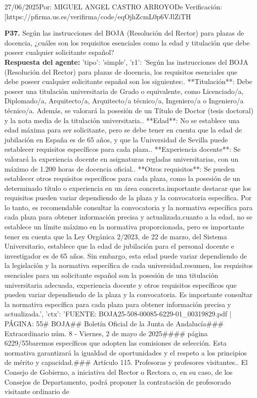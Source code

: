 \documentclass{article}
\begin{document}
\begin{itemize}
{27/06/2025\nFirmado Por: MIGUEL ANGEL CASTRO ARROYO\nUrl De Verificación: [https://pfirma.us.es/verifirma/code/eqOjhZcmL0p6VJlZiTH%

      \item \textbf{P37.} Según las instrucciones del BOJA (Resolución del Rector) para plazas de docencia, ¿cuáles son los requisitos esenciales como la edad y titulación que debe poseer cualquier solicitante español? \\
            \textbf{Respuesta del agente:} {'tipo': 'simple', 'r1': 'Según las instrucciones del BOJA (Resolución del Rector) para plazas de docencia, los requisitos esenciales que debe poseer cualquier solicitante español son los siguientes:\n{}. **Titulación**: Debe poseer una titulación universitaria de Grado o equivalente, como Licenciado/a, Diplomado/a, Arquitecto/a, Arquitecto/a técnico/a, Ingeniero/a o Ingeniero/a técnico/a. Además, se valorará la posesión de un Título de Doctor (tesis doctoral) y la nota media de la titulación universitaria.. **Edad**: No se establece una edad máxima para ser solicitante, pero se debe tener en cuenta que la edad de jubilación en España es de 65 años, y que la Universidad de Sevilla puede establecer requisitos específicos para cada plaza.. **Experiencia docente**: Se valorará la experiencia docente en asignaturas regladas universitarias, con un máximo de 1.200 horas de docencia oficial.. **Otros requisitos**: Se pueden establecer otros requisitos específicos para cada plaza, como la posesión de un determinado título o experiencia en un área concreta.\n\nEs importante destacar que los requisitos pueden variar dependiendo de la plaza y la convocatoria específica. Por lo tanto, es recomendable consultar la convocatoria y la normativa específica para cada plaza para obtener información precisa y actualizada.\n\nEn cuanto a la edad, no se establece un límite máximo en la normativa proporcionada, pero es importante tener en cuenta que la Ley Orgánica 2/2023, de 22 de marzo, del Sistema Universitario, establece que la edad de jubilación para el personal docente e investigador es de 65 años. Sin embargo, esta edad puede variar dependiendo de la legislación y la normativa específica de cada universidad.\n\nEn resumen, los requisitos esenciales para un solicitante español son la posesión de una titulación universitaria adecuada, experiencia docente y otros requisitos específicos que pueden variar dependiendo de la plaza y la convocatoria. Es importante consultar la normativa específica para cada plaza para obtener información precisa y actualizada.', 'ctx': 'FUENTE: BOJA25-508-00085-6229-01_00319829.pdf | PÁGINA: 55\n# BOJA\n## Boletín Oficial de la Junta de Andalucía\n### Extraordinario núm. 8 - Viernes, 2 de mayo de 2025\n#### página 6229/55\n\nLos baremos específicos que adopten las comisiones de selección. Esta normativa garantizará la igualdad de oportunidades y el respeto a los principios de mérito y capacidad.\n\n### Artículo 115. Profesoras y profesores visitantes.. El Consejo de Gobierno, a iniciativa del Rector o Rectora o, en su caso, de los Consejos de Departamento, podrá proponer la contratación de profesorado visitante ordinario de }}
\end{itemize}
\end{document}
